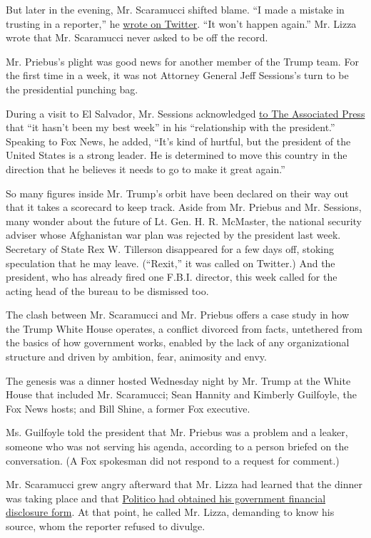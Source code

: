 But later in the evening, Mr. Scaramucci shifted blame. ``I made a
mistake in trusting in a reporter,'' he
\href{https://twitter.com/Scaramucci/status/890736308498378753}{wrote on
Twitter}. ``It won't happen again.'' Mr. Lizza wrote that Mr. Scaramucci
never asked to be off the record.

Mr. Priebus's plight was good news for another member of the Trump team.
For the first time in a week, it was not Attorney General Jeff
Sessions's turn to be the presidential punching bag.

During a visit to El Salvador, Mr. Sessions acknowledged
\href{https://www.apnews.com/19a4a6ac62064554ac82a08567d1ef31/Sessions-tells-AP-he's-not-stepping-down-unless-asked}{to
The Associated Press} that ``it hasn't been my best week'' in his
``relationship with the president.'' Speaking to Fox News, he added,
``It's kind of hurtful, but the president of the United States is a
strong leader. He is determined to move this country in the direction
that he believes it needs to go to make it great again.''

So many figures inside Mr. Trump's orbit have been declared on their way
out that it takes a scorecard to keep track. Aside from Mr. Priebus and
Mr. Sessions, many wonder about the future of Lt. Gen. H. R. McMaster,
the national security adviser whose Afghanistan war plan was rejected by
the president last week. Secretary of State Rex W. Tillerson disappeared
for a few days off, stoking speculation that he may leave. (``Rexit,''
it was called on Twitter.) And the president, who has already fired one
F.B.I. director, this week called for the acting head of the bureau to
be dismissed too.

The clash between Mr. Scaramucci and Mr. Priebus offers a case study in
how the Trump White House operates, a conflict divorced from facts,
untethered from the basics of how government works, enabled by the lack
of any organizational structure and driven by ambition, fear, animosity
and envy.

The genesis was a dinner hosted Wednesday night by Mr. Trump at the
White House that included Mr. Scaramucci; Sean Hannity and Kimberly
Guilfoyle, the Fox News hosts; and Bill Shine, a former Fox executive.

Ms. Guilfoyle told the president that Mr. Priebus was a problem and a
leaker, someone who was not serving his agenda, according to a person
briefed on the conversation. (A Fox spokesman did not respond to a
request for comment.)

Mr. Scaramucci grew angry afterward that Mr. Lizza had learned that the
dinner was taking place and that
\href{http://www.politico.com/story/2017/07/26/scaramucci-trump-skybridge-profits-241006}{Politico
had obtained his government financial disclosure form}. At that point,
he called Mr. Lizza, demanding to know his source, whom the reporter
refused to divulge.

